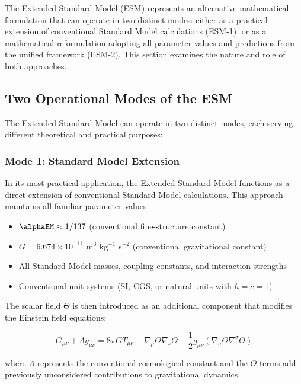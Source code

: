 	The Extended Standard Model (ESM) represents an alternative mathematical formulation that can operate in two distinct modes: either as a practical extension of conventional Standard Model calculations (ESM-1), or as a mathematical reformulation adopting all parameter values and predictions from the unified framework (ESM-2). This section examines the nature and role of both approaches.
	
	\subsection{Two Operational Modes of the ESM}
	\label{subsec:two_operational_modes}
	
	The Extended Standard Model can operate in two distinct modes, each serving different theoretical and practical purposes:
	
	\subsubsection{Mode 1: Standard Model Extension}
	\label{subsubsec:mode1_sm_extension}
	
	In its most practical application, the Extended Standard Model functions as a direct extension of conventional Standard Model calculations. This approach maintains all familiar parameter values:
	
	\begin{itemize}
		\item $\alphaEM \approx 1/137$ (conventional fine-structure constant) \cite{PDG2020}
		\item $G = 6.674 \times 10^{-11}$ m$^3$ kg$^{-1}$ s$^{-2}$ (conventional gravitational constant)
		\item All Standard Model masses, coupling constants, and interaction strengths
		\item Conventional unit systems (SI, CGS, or natural units with $\hbar = c = 1$)
	\end{itemize}
	
	The scalar field $\Theta$ is then introduced as an additional component that modifies the Einstein field equations:
	
	\begin{equation}
		G_{\mu\nu} + \Lambda g_{\mu\nu} = 8\pi G T_{\mu\nu} + \nabla_{\mu}\Theta\nabla_{\nu}\Theta - \frac{1}{2}g_{\mu\nu}(\nabla_{\sigma}\Theta\nabla^{\sigma}\Theta)
	\end{equation}
	
	where $\Lambda$ represents the conventional cosmological constant and the $\Theta$ terms add previously unconsidered contributions to gravitational dynamics.
	
